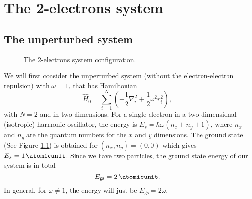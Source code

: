 
\graphicspath{{Mainmatter/figures/PNG/}{Mainmatter/figures/PDF/}{Mainmatter/figures/}}

\chapter{The 2-electrons system}

\section{The unperturbed system}
\label{sec:2e_unp}

\begin{figure}[H]
	\centering
	\caption{The 2-electrons system configuration.}
	\label{eq:sketch_2e}
\end{figure}

We will first consider the unperturbed system (without the electron-electron repulsion) with $\omega = 1$, that has Hamiltonian
\begin{equation}
	\hat{H}_0 = 
	\sum_{i=1}^{N} \left( -\frac{1}{2}\nabla_i^2 + \frac{1}{2}\omega^2r_i^2 \right),
\end{equation}
with $N=2$ and in two dimensions. For a single electron in a two-dimensional (isotropic) harmonic oscillator, the energy is $E_s = \hbar\omega(n_x + n_y + 1)$, where $n_x$ and $n_y$ are the quantum numbers for the $x$ and $y$ dimensions. The ground state (See Figure \ref{eq:sketch_2e}) is obtained for $(n_x,n_y) = (0,0)$ which gives $E_s = \SI{1}{\atomicunit}$. Since we have two particles, the ground state energy of our system is in total
\begin{equation*}
	E_{\text{gs}} = \SI{2}{\atomicunit}.
\end{equation*}
In general, for $\omega \neq 1$, the energy will just be $E_{\text{gs}} = 2\omega$.

